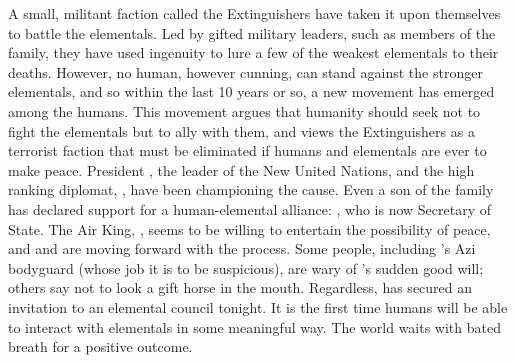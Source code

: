 \documentclass[blue]{elementals}
\begin{document}
A small, militant faction called the Extinguishers have taken it upon themselves to battle the elementals.  Led by gifted military leaders, such as members of the \cDema{\formal} family, they have used ingenuity to lure a few of the weakest elementals to their deaths.  However, no human, however cunning, can stand against the stronger elementals, and so within the last 10 years or so, a new movement has emerged among the humans. This movement argues that humanity should seek not to fight the elementals but to ally with them, and views the Extinguishers as a terrorist faction that must be eliminated if humans and elementals are ever to make peace. President \cLeader{}, the leader of the New United Nations, and the high ranking diplomat, \cAvatar{}, have been championing the cause. Even a son of the \cDema{\formal} family has declared support for a human-elemental alliance: \cDema{}, who is now Secretary of State.  The Air King, \cKing{}, seems to be willing to entertain the possibility of peace, and \cLeader{} and \cAvatar{} are moving forward with the process. Some people, including \cLeader{\formal}'s Azi bodyguard \cRomeo{} (whose job it is to be suspicious), are wary of \cKing{}'s sudden good will; others say not to look a gift horse in the mouth. Regardless, \cLeader{} has secured an invitation to an elemental council tonight. It is the first time humans will be able to interact with elementals in some meaningful way. The world waits with bated breath for a positive outcome.

\end{document}
